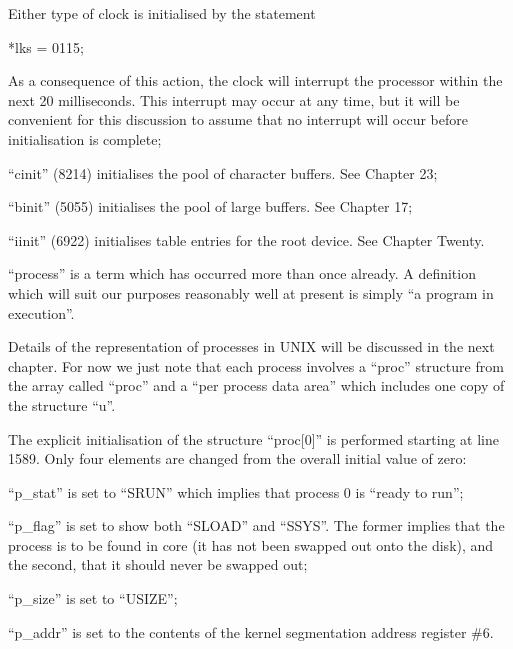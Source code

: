 \bd
\item[1607:] Either type of clock is initialised by the statement

*lks = 0115;

As a consequence of this action,
the clock will interrupt the processor within the next 20
 milliseconds. This interrupt may
occur at any time, but it will be
convenient for this discussion to
assume that no interrupt will
occur before initialisation is
complete;

\item[1613:] ``cinit'' (8214) initialises the
 pool of character buffers. See
 Chapter 23;

\item[1614:] ``binit'' (5055) initialises
 the pool of large buffers. See Chapter 17;

\item[1615:] ``iinit'' (6922) initialises table
 entries for the root device. See
 Chapter Twenty.
\ed


``process'' is a term which has occurred
more than once already. A definition
which will suit our purposes reasonably
well at present is simply ``a program in
execution''.


Details of the representation of
processes in UNIX will be discussed in
the next chapter. For now we just note
that each process involves a ``proc''
structure from the array called ``proc''
and a ``per process data area'' which
includes one copy of the structure ``u''.



The explicit initialisation of the
structure ``proc[0]'' is performed starting at line 1589. Only four elements
are changed from the overall initial
value of zero:

\bd
\item[(a)] ``p\_stat'' is set to ``SRUN'' which
 implies that process 0 is
 ``ready to run'';

\item[(b)] ``p\_flag'' is set to show both
 ``SLOAD'' and ``SSYS''. The former
 implies that the process is to
 be found in core (it has not
 been swapped out onto the disk),
 and the second, that it should
 never be swapped out;

\item[(c)] ``p\_size'' is set to ``USIZE'';

\item[(d)] ``p\_addr'' is set to the contents
 of the kernel segmentation address register \#6.
\ed



